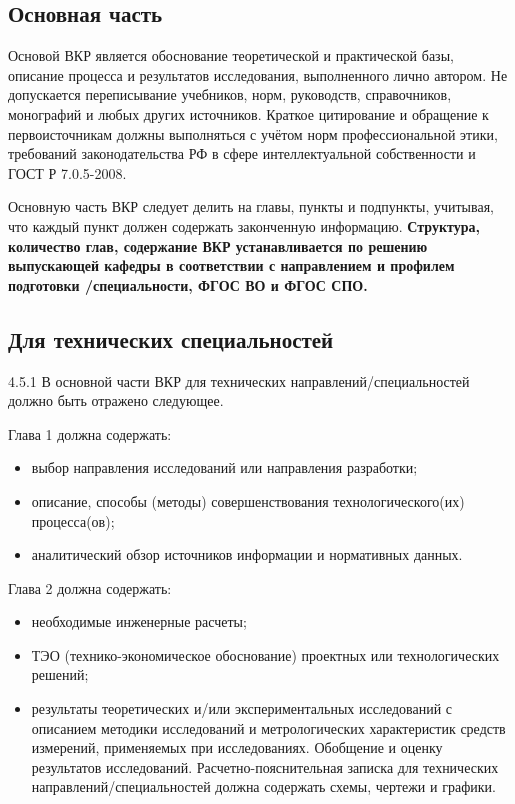     \subsection{Основная часть}
    Основой ВКР является обоснование теоретической и практической базы, описание
    процесса и результатов исследования, выполненного лично автором. Не допускается
    переписывание учебников, норм, руководств, справочников, монографий и любых других
    источников. Краткое цитирование и обращение к первоисточникам должны выполняться с
    учётом норм профессиональной этики, требований законодательства РФ в сфере
    интеллектуальной собственности и ГОСТ Р 7.0.5-2008.

    Основную часть ВКР следует делить на главы, пункты и подпункты, учитывая, что
    каждый пункт должен содержать законченную информацию. \textbf{Структура, количество глав,
    содержание ВКР устанавливается по решению выпускающей кафедры в соответствии с
    направлением и профилем подготовки /специальности, ФГОС ВО и ФГОС СПО.}

    \subsection{Для технических специальностей}
    4.5.1 В основной части ВКР для технических направлений/специальностей должно
    быть отражено следующее.

    Глава 1 должна содержать:
    \begin{itemize}
        \item  выбор направления исследований или направления разработки;
        \item  описание, способы (методы) совершенствования технологического(их) процесса(ов);
        \item  аналитический обзор источников информации и нормативных данных.
    \end{itemize}

    Глава 2 должна содержать:
    \begin{itemize}
        \item  необходимые инженерные расчеты;
        \item  ТЭО (технико-экономическое обоснование) проектных или технологических
        решений;
        \item  результаты теоретических и/или экспериментальных исследований с описанием
        методики исследований и метрологических характеристик средств измерений, применяемых
        при исследованиях. Обобщение и оценку результатов исследований. Расчетно-пояснительная
        записка для технических направлений/специальностей должна содержать схемы, чертежи и
        графики.
    \end{itemize}

